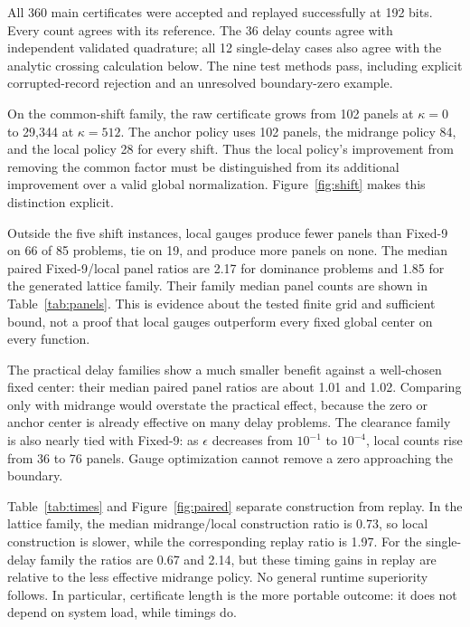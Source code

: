 All 360 main certificates were accepted and replayed successfully at 192 bits. Every count agrees with its reference. The 36 delay counts agree with independent validated quadrature; all 12 single-delay cases also agree with the analytic crossing calculation below. The nine test methods pass, including explicit corrupted-record rejection and an unresolved boundary-zero example.

On the common-shift family, the raw certificate grows from 102 panels at $\kappa=0$ to 29,344 at $\kappa=512$. The anchor policy uses 102 panels, the midrange policy 84, and the local policy 28 for every shift. Thus the local policy's improvement from removing the common factor must be distinguished from its additional improvement over a valid global normalization. Figure~\ref{fig:shift} makes this distinction explicit.

Outside the five shift instances, local gauges produce fewer panels than Fixed-9 on 66 of 85 problems, tie on 19, and produce more panels on none. The median paired Fixed-9/local panel ratios are 2.17 for dominance problems and 1.85 for the generated lattice family. Their family median panel counts are shown in Table~\ref{tab:panels}. This is evidence about the tested finite grid and sufficient bound, not a proof that local gauges outperform every fixed global center on every function.

The practical delay families show a much smaller benefit against a well-chosen fixed center: their median paired panel ratios are about 1.01 and 1.02. Comparing only with midrange would overstate the practical effect, because the zero or anchor center is already effective on many delay problems. The clearance family is also nearly tied with Fixed-9: as $\epsilon$ decreases from $10^{-1}$ to $10^{-4}$, local counts rise from 36 to 76 panels. Gauge optimization cannot remove a zero approaching the boundary.

Table~\ref{tab:times} and Figure~\ref{fig:paired} separate construction from replay. In the lattice family, the median midrange/local construction ratio is 0.73, so local construction is slower, while the corresponding replay ratio is 1.97. For the single-delay family the ratios are 0.67 and 2.14, but these timing gains in replay are relative to the less effective midrange policy. No general runtime superiority follows. In particular, certificate length is the more portable outcome: it does not depend on system load, while timings do.
